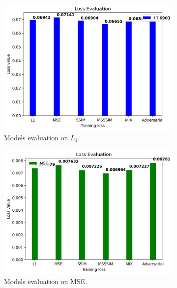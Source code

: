 \begin{figure}[H]\centering
  \begin{subfigure}[t]{0.45\textwidth}
    \centering
    \includegraphics[width=\linewidth]{img/one-trial/model_loss_one_trial_l1.png}
    \caption{Models evaluation on $L_1$.}
  \end{subfigure}
  \begin{subfigure}[t]{0.45\textwidth}
    \centering
    \includegraphics[width=\linewidth]{img/one-trial/model_loss_one_trial_mse.png}
    \caption{Models evaluation on MSE.}
  \end{subfigure}
  \\
  \begin{subfigure}[t]{0.45\textwidth}
    \centering

\end{subfigure}
\end{figure}
